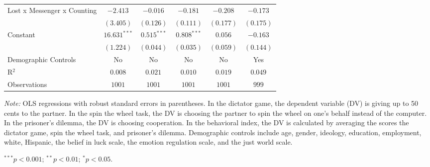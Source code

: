 \begin{table}[!t]
\begin{center}
{\begin{threeparttable}
\begin{tabular}{l c c c c c}
Lost x Messenger x Counting & $-2.413$       & $-0.016$      & $-0.181$      & $-0.208$  & $-0.173$  \\
                            & $(3.405)$      & $(0.126)$     & $(0.111)$     & $(0.177)$ & $(0.175)$ \\
Constant                    & $16.631^{***}$ & $0.515^{***}$ & $0.808^{***}$ & $0.056$   & $-0.163$  \\
                            & $(1.224)$      & $(0.044)$     & $(0.035)$     & $(0.059)$ & $(0.144)$ \\
\midrule
Demographic Controls        & No             & No            & No            & No        & Yes       \\
R$^2$                       & $0.008$        & $0.021$       & $0.010$       & $0.019$   & $0.049$   \\
Observations                & $1001$         & $1001$        & $1001$        & $1001$    & $999$     \\
\bottomrule
\end{tabular}
\begin{tablenotes}[flushleft]
\scriptsize{\item[\hspace{-5mm}] \textit{Note:} OLS regressions with robust standard errors in parentheses. 
                                In the dictator game, the dependent variable (DV) is giving up to 50 cents to the partner. 
                                In the spin the wheel task, the DV is choosing the partner to spin the wheel on one’s behalf instead of the computer. 
                                In the prisoner’s dilemma, the DV is choosing cooperation. 
                                In the behavioral index, the DV is calculated by averaging the scores the dictator game, spin the wheel task, and prisoner's dilemma.
                                Demographic controls include age, gender, ideology,
                                education, employment, white, Hispanic, the belief in luck scale, the emotion regulation scale, and the just world scale. \item[\hspace{-5mm}] $^{***}p<0.001$; $^{**}p<0.01$; $^{*}p<0.05$.}
\end{tablenotes}
\end{threeparttable}
}
\label{tab:behavior_unrelated_regression_counting}
\end{center}
\end{table}

\renewcommand{\baselinestretch}{1.67}%
